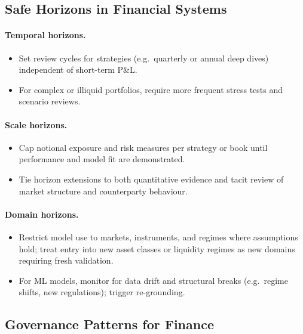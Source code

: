 \subsection{Safe Horizons in Financial Systems}

\paragraph{Temporal horizons.}

\begin{itemize}
  \item Set review cycles for strategies (e.g.\ quarterly or annual
        deep dives) independent of short-term P\&L.
  \item For complex or illiquid portfolios, require more frequent
        stress tests and scenario reviews.
\end{itemize}

\paragraph{Scale horizons.}

\begin{itemize}
  \item Cap notional exposure and risk measures per strategy or book
        until performance and model fit are demonstrated.
  \item Tie horizon extensions to both quantitative evidence and tacit
        review of market structure and counterparty behaviour.
\end{itemize}

\paragraph{Domain horizons.}

\begin{itemize}
  \item Restrict model use to markets, instruments, and regimes where
        assumptions hold; treat entry into new asset classes or
        liquidity regimes as new domains requiring fresh validation.
  \item For ML models, monitor for data drift and structural breaks
        (e.g.\ regime shifts, new regulations); trigger re-grounding.
\end{itemize}

\subsection{Governance Patterns for Finance}

